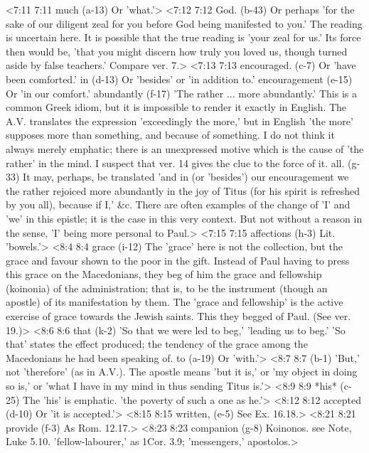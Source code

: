 <7:11 7:11  much (a-13)  Or 'what.'>
<7:12 7:12  God. (b-43)  Or perhaps 'for the sake of our diligent zeal for you before  God being manifested to you.' The reading is uncertain here. It  is possible that the true reading is 'your zeal for us.' Its  force then would be, 'that you might discern how truly you  loved us, though turned aside by false teachers.' Compare ver. 7.>
<7:13 7:13  encouraged. (c-7)  Or 'have been comforted.'
  in (d-13)  Or 'besides' or 'in addition to.'
  encouragement (e-15)  Or 'in our comfort.'
  abundantly (f-17)  'The rather ... more abundantly.' This is a common Greek  idiom, but it is impossible to render it exactly in English.  The A.V. translates the expression 'exceedingly the more,'  but in English 'the more' supposes more than something, and  because of something. I do not think it always merely  emphatic; there is an unexpressed motive which is the cause of  'the rather' in the mind. I suspect that ver. 14 gives the clue  to the force of it.
  all. (g-33)  It may, perhaps, be translated 'and in (or 'besides') our  encouragement we the rather rejoiced more abundantly in the joy  of Titus (for his spirit is refreshed by you all), because if  I,' &c. There are often examples of the change of 'I' and 'we'  in this epistle; it is the case in this very context. But not  without a reason in the sense, 'I' being more personal to Paul.>
<7:15 7:15  affections (h-3)  Lit. 'bowels.'>
<8:4 8:4  grace (i-12)  The 'grace' here is not the collection, but the grace and  favour shown to the poor in the gift. Instead of Paul having to  press this grace on the Macedonians, they beg of him the grace  and fellowship (koinonia) of the administration; that is, to  be the instrument (though an apostle) of its manifestation by  them. The 'grace and fellowship' is the active exercise of  grace towards the Jewish saints. This they begged of Paul. (See  ver. 19.)>
<8:6 8:6  that (k-2)  'So that we were led to beg,' 'leading us to beg.' 'So that'  states the effect produced; the tendency of the grace among the  Macedonians he had been speaking of.
  to (a-19)  Or 'with.'>
<8:7 8:7   (b-1)  'But,' not 'therefore' (as in A.V.). The apostle means 'but  it is,' or 'my object in doing so is,' or 'what I have in my  mind in thus sending Titus is.'>
<8:9 8:9  *his* (c-25)  The 'his' is emphatic. 'the poverty of such a one as he.'>
<8:12 8:12  accepted (d-10)  Or 'it is accepted.'>
<8:15 8:15  written, (e-5)  See Ex. 16.18.>
<8:21 8:21  provide (f-3)  As Rom. 12.17.>
<8:23 8:23  companion (g-8)  Koinonos. see Note, Luke 5.10. 'fellow-labourer,' as 1Cor.  3.9; 'messengers,' apostolos.>
